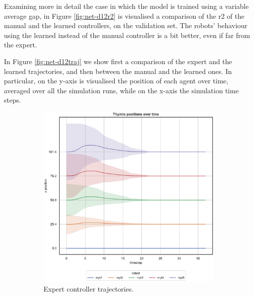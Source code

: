 Examining more in detail the case in which the model is trained using a 
variable average gap, in Figure \ref{fig:net-d12r2} is visualised a comparison of 
the \gls{r2} of the manual and the learned controllers, on the validation set. 
The robots' behaviour using the learned instead of the manual controller is a 
bit better, even if far from the expert.

In Figure \ref{fig:net-d12traj} we show first a comparison of the expert and the 
learned trajectories, and then between the manual and the learned ones. 
In particular, on the y-axis is visualised the position of each agent over time, 
averaged over all the simulation runs, while on the x-axis the simulation 
time steps. 
\begin{figure}[!htb]
	\begin{center}
		\begin{subfigure}[h]{0.49\textwidth}
			\centering
			\includegraphics[width=.95\textwidth]{contents/images/net-d12/position-overtime-omniscient}%
			\caption{Expert controller trajectories.}
		\end{subfigure}
		\hfill
		\begin{subfigure}[h]{0.49\textwidth}
			\centering

\end{subfigure}
\end{center}
\end{figure}
